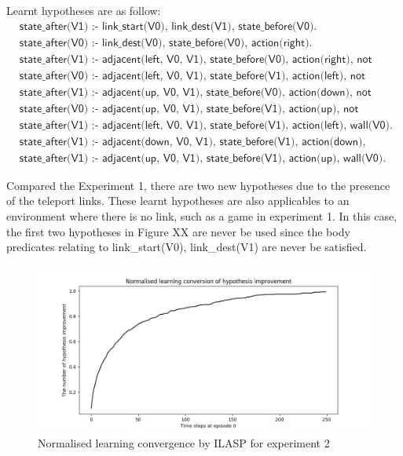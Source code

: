 Learnt hypotheses are as follow:
\begin{equation}
\begin{split}
&\textsf{state\_after(V1) :- link\_start(V0), link\_dest(V1), state\_before(V0).}\\
&\textsf{state\_after(V0) :- link\_dest(V0), state\_before(V0), action(right).}\\
&\textsf{state\_after(V1) :- adjacent(left, V0, V1), state\_before(V0), action(right), not wall(V1).}\\
&\textsf{state\_after(V0) :- adjacent(left, V0, V1), state\_before(V1), action(left), not wall(V0).}\\
&\textsf{state\_after(V1) :- adjacent(up, V0, V1), state\_before(V0), action(down), not wall(V1).}\\
&\textsf{state\_after(V0) :- adjacent(up, V0, V1), state\_before(V1), action(up), not wall(V0).}\\
&\textsf{state\_after(V1) :- adjacent(left, V0, V1), state\_before(V1), action(left), wall(V0).}\\
&\textsf{state\_after(V1) :- adjacent(down, V0, V1), state\_before(V1), action(down), wall(V0).}\\
&\textsf{state\_after(V1) :- adjacent(up, V0, V1), state\_before(V1), action(up), wall(V0).}
\end{split}
\label{experiment2_ilasp_complete}
\end{equation}

Compared the Experiment 1, there are two new hypotheses due to the presence of the teleport links.
These learnt hypotheses are also applicables to an environment where there is no link, such as a game in experiment 1.
In this case, the first two hypotheses in Figure XX are never be used since the body predicates relating to link\_start(V0), link\_dest(V1) are never be satisfied.

\begin{figure}[!htb]
\centering
\includegraphics[width=1.0\textwidth]{./figures/experiment2_ilasp}
\caption{Normalised learning convergence by ILASP for experiment 2}
\label{experiment1_test}
\end{figure}

